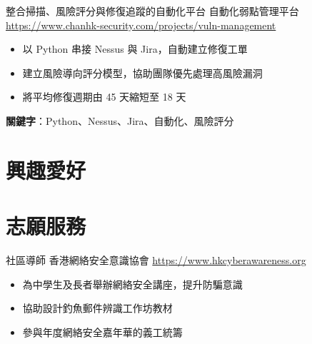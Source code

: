\documentclass[a4paper, serif, 10pt]{moderncv}
\begin{document}
        {整合掃描、風險評分與修復追蹤的自動化平台}
        {自動化弱點管理平台}
        {\url{https://www.chanhk-security.com/projects/vuln-management}}
        {}
        {\begin{itemize}
\item 以 Python 串接 Nessus 與 Jira，自動建立修復工單
\item 建立風險導向評分模型，協助團隊優先處理高風險漏洞
\item 將平均修復週期由 45 天縮短至 18 天
\end{itemize}
\textbf{關鍵字}：Python、Nessus、Jira、自動化、風險評分}
\section{興趣愛好}

\section{志願服務}

        {社區導師}
        {香港網絡安全意識協會}
        {\url{https://www.hkcyberawareness.org}}
        {}
        {\begin{itemize}
\item 為中學生及長者舉辦網絡安全講座，提升防騙意識
\item 協助設計釣魚郵件辨識工作坊教材
\item 參與年度網絡安全嘉年華的義工統籌
\end{itemize}}
    
\end{document}
